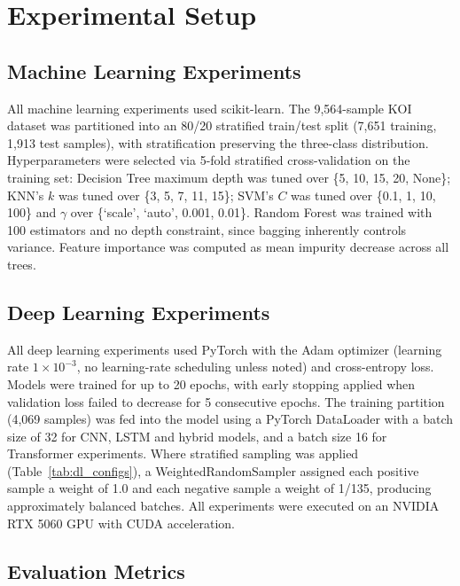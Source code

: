 \documentclass[preprint,11pt,times]{elsarticle}
\begin{document}
\clearpage %

\section{Experimental Setup}\label{sec5}

\subsection{Machine Learning Experiments}\label{subsec5a}

All machine learning experiments used scikit-learn. The 9,564-sample KOI dataset was partitioned into an 80/20 stratified train/test split (7,651 training, 1,913 test samples), with stratification preserving the three-class distribution. Hyperparameters were selected via 5-fold stratified cross-validation on the training set: Decision Tree maximum depth was tuned over \{5, 10, 15, 20, None\}; KNN's $k$ was tuned over \{3, 5, 7, 11, 15\}; SVM's $C$ was tuned over \{0.1, 1, 10, 100\} and $\gamma$ over \{`scale', `auto', 0.001, 0.01\}. Random Forest was trained with 100 estimators and no depth constraint, since bagging inherently controls variance. Feature importance was computed as mean impurity decrease across all trees.

\subsection{Deep Learning Experiments}\label{subsec5b}

All deep learning experiments used PyTorch with the Adam optimizer (learning rate $1\times10^{-3}$, no learning-rate scheduling unless noted) and cross-entropy loss. Models were trained for up to 20 epochs, with early stopping applied when validation loss failed to decrease for 5 consecutive epochs. The training partition (4,069 samples) was fed into the model using a PyTorch DataLoader with a batch size of 32 for CNN, LSTM and hybrid models, and a batch size 16 for Transformer experiments. Where stratified sampling was applied (Table~\ref{tab:dl_configs}), a WeightedRandomSampler assigned each positive sample a weight of 1.0 and each negative sample a weight of 1/135, producing approximately balanced batches. All experiments were executed on an NVIDIA RTX 5060 GPU with CUDA acceleration.

\subsection{Evaluation Metrics}\label{subsec5c}
\end{document}
